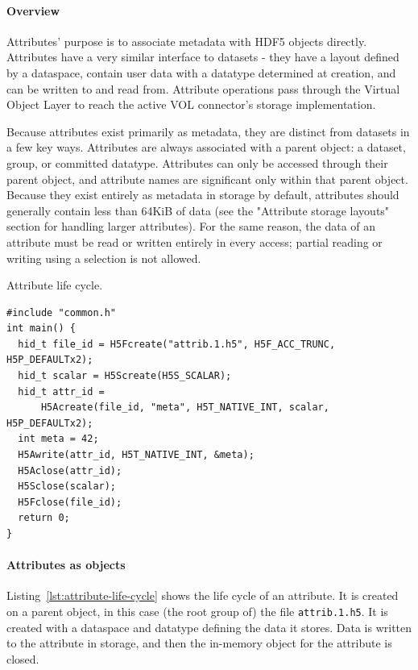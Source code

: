 \paragraph{Overview} Attributes' purpose is to associate metadata with HDF5 objects directly. Attributes have a very similar interface to datasets - they have a layout defined by a dataspace, contain user data with a datatype determined at creation, and can be written to and read from. Attribute operations pass through the Virtual Object Layer to reach the active VOL connector's storage implementation.

Because attributes exist primarily as metadata, they are distinct from datasets in a few key ways. Attributes are always associated with a parent object: a dataset, group, or committed datatype. Attributes can only be accessed through their parent object, and attribute names are significant only within that parent object. Because they exist entirely as metadata in storage by default, attributes should generally contain less than 64KiB of data (see the "Attribute storage layouts" section for handling larger attributes). For the same reason, the data of an attribute must be read or written entirely in every access; partial reading or writing using a selection is not allowed.

\begin{listing}
\centering
\caption{Attribute life cycle.}
\label{lst:attribute-life-cycle}
\begin{verbatim}
#include "common.h"
int main() {
  hid_t file_id = H5Fcreate("attrib.1.h5", H5F_ACC_TRUNC, H5P_DEFAULTx2);
  hid_t scalar = H5Screate(H5S_SCALAR);
  hid_t attr_id =
      H5Acreate(file_id, "meta", H5T_NATIVE_INT, scalar, H5P_DEFAULTx2);
  int meta = 42;
  H5Awrite(attr_id, H5T_NATIVE_INT, &meta);
  H5Aclose(attr_id);
  H5Sclose(scalar);
  H5Fclose(file_id);
  return 0;
}
\end{verbatim}
\end{listing}

\paragraph{Attributes as objects} Listing~\ref{lst:attribute-life-cycle} shows the life cycle of an attribute. It is created on a parent object, in this case (the root group of) the file \texttt{attrib.1.h5}. It is created with a dataspace and datatype defining the data it stores. Data is written to the attribute in storage, and then the in-memory object for the attribute is closed. 

